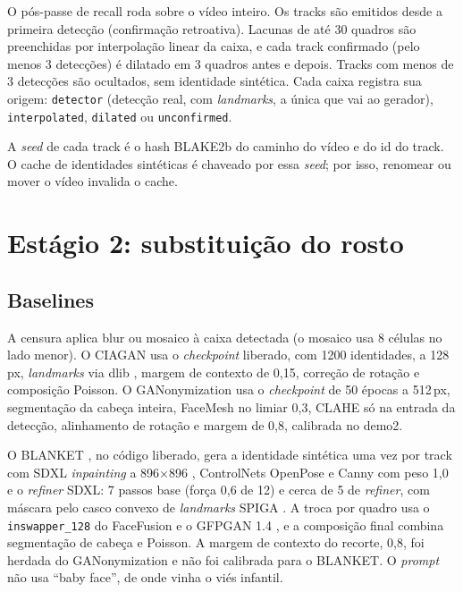 O pós-passe de recall roda sobre o vídeo inteiro. Os tracks são emitidos desde a primeira detecção (confirmação retroativa). Lacunas de até 30 quadros são preenchidas por interpolação linear da caixa, e cada track confirmado (pelo menos 3 detecções) é dilatado em 3 quadros antes e depois. Tracks com menos de 3 detecções são ocultados, sem identidade sintética. Cada caixa registra sua origem: \texttt{detector} (detecção real, com \emph{landmarks}, a única que vai ao gerador), \texttt{interpolated}, \texttt{dilated} ou \texttt{unconfirmed}.

A \emph{seed} de cada track é o hash BLAKE2b do caminho do vídeo e do id do track. O cache de identidades sintéticas é chaveado por essa \emph{seed}; por isso, renomear ou mover o vídeo invalida o cache.

\section{Estágio 2: substituição do rosto}

\subsection{Baselines}

A censura aplica blur ou mosaico à caixa detectada (o mosaico usa 8 células no lado menor). O CIAGAN \citep{ciagan} usa o \emph{checkpoint} liberado, com 1200 identidades, a 128\,px, \emph{landmarks} via dlib \citep{dlib}, margem de contexto de 0,15, correção de rotação e composição Poisson. O GANonymization \citep{hellmann} usa o \emph{checkpoint} de 50 épocas a 512\,px, segmentação da cabeça inteira, FaceMesh no limiar 0,3, CLAHE só na entrada da detecção, alinhamento de rotação e margem de 0,8, calibrada no demo2.

O BLANKET \citep{blanket}, no código liberado, gera a identidade sintética uma vez por track com SDXL \emph{inpainting} a 896$\times$896 \citep{sdxl}, ControlNets OpenPose e Canny com peso 1,0 \citep{controlnet} e o \emph{refiner} SDXL: 7 passos base (força 0,6 de 12) e cerca de 5 de \emph{refiner}, com máscara pelo casco convexo de \emph{landmarks} SPIGA \citep{spiga}. A troca por quadro usa o \texttt{inswapper\_128} do FaceFusion e o GFPGAN 1.4 \citep{facefusion,gfpgan}, e a composição final combina segmentação de cabeça e Poisson. A margem de contexto do recorte, 0,8, foi herdada do GANonymization e não foi calibrada para o BLANKET. O \emph{prompt} não usa ``baby face'', de onde vinha o viés infantil.

